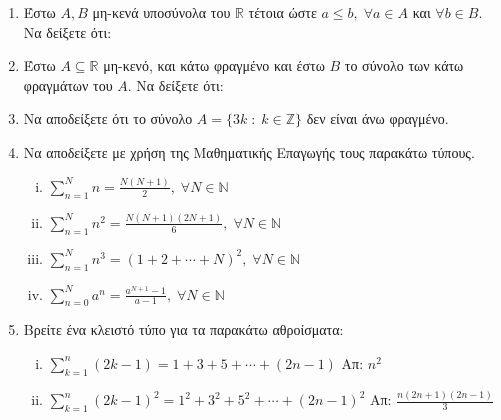\begin{enumerate}
    \item Έστω $ A, B $ μη-κενά υποσύνολα του $ \mathbb{R} $ τέτοια ώστε 
      $ a \leq b, \; \forall a \in A $ και $ \forall b \in B $.
      Να δείξετε ότι:

    \item Έστω $ A \subseteq \mathbb{R} $ μη-κενό, και κάτω φραγμένο και έστω 
      $ B $ το σύνολο των κάτω φραγμάτων του $A$. Να δείξετε ότι:

    \item \label{ask:3z} Να αποδείξετε ότι το σύνολο 
      $ A = \{ 3k \; : \; k \in \mathbb{Z} \} $ δεν είναι άνω φραγμένο.

    \item Να αποδείξετε με χρήση της Μαθηματικής Επαγωγής τους παρακάτω τύπους.
      \label{eq:epagsums}
      \begin{enumerate}[i)]
        \item $ \sum_{n=1}^{N} n = \frac{N(N+1)}{2},\; \forall N \in
          \mathbb{N} $
        \item $ \sum_{n=1}^{N} n^{2} = \frac{N(N+1)(2N+1)}{6},\; \forall 
          N \in \mathbb{N} $
        \item $ \sum_{n=1}^{N} n^{3} = (1+2+\cdots + N)^{2}, \; 
          \forall N \in \mathbb{N} $
        \item $ \sum_{n=0}^{N} a^{n} = \frac{a^{N+1} - 1}{a-1},\; 
          \forall N \in \mathbb{N}$
      \end{enumerate}

    \item \label{ask:sums} Βρείτε ένα κλειστό τύπο για τα παρακάτω 
      αθροίσματα: 
      \begin{enumerate}[i)]
        \item $ \sum_{k=1}^{n} (2k-1) = 1 + 3 + 5 + \cdots + (2n-1)  
          $ \hfill Απ: $ n^{2} $ 

        \item $ \sum_{k=1}^{n} (2k-1)^{2} = 1^{2} + 3^{2} + 5^{2} + \cdots 
          + (2n-1)^{2}  $ \hfill Απ: $ \frac{n(2n+1)(2n-1)}{3} $ 
      \end{enumerate}


\end{enumerate}
